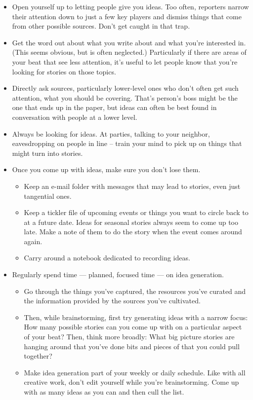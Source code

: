 \documentclass[
  11pt,
  american,
  letterpaperpaper,
  extrafontsizes,onecolumn,openright
  ]{memoir}
\providecommand{\tightlist}{%
  \setlength{\itemsep}{0pt}\setlength{\parskip}{0pt}}
\begin{document}
\begin{itemize}
\tightlist
\item
  Open yourself up to letting people give you ideas. Too often, reporters narrow their attention down to just a few key players and dismiss things that come from other possible sources. Don't get caught in that trap.
\item
  Get the word out about what you write about and what you're interested in. (This seems obvious, but is often neglected.) Particularly if there are areas of your beat that see less attention, it's useful to let people know that you're looking for stories on those topics.
\item
  Directly ask sources, particularly lower-level ones who don't often get such attention, what you should be covering. That's person's boss might be the one that ends up in the paper, but ideas can often be best found in conversation with people at a lower level.
\item
  Always be looking for ideas. At parties, talking to your neighbor, eavesdropping on people in line -- train your mind to pick up on things that might turn into stories.
\item
  Once you come up with ideas, make sure you don't lose them.

  \begin{itemize}
  \tightlist
  \item
    Keep an e-mail folder with messages that may lead to stories, even just tangential ones.
  \item
    Keep a tickler file of upcoming events or things you want to circle back to at a future date. Ideas for seasonal stories always seem to come up too late. Make a note of them to do the story when the event comes around again.
  \item
    Carry around a notebook dedicated to recording ideas.
  \end{itemize}
\item
  Regularly spend time --- planned, focused time --- on idea generation.

  \begin{itemize}
  \tightlist
  \item
    Go through the things you've captured, the resources you've curated and the information provided by the sources you've cultivated.
  \item
    Then, while brainstorming, first try generating ideas with a narrow focus: How many possible stories can you come up with on a particular aspect of your beat? Then, think more broadly: What big picture stories are hanging around that you've done bits and pieces of that you could pull together?
  \item
    Make idea generation part of your weekly or daily schedule. Like with all creative work, don't edit yourself while you're brainstorming. Come up with as many ideas as you can and then cull the list.
  \end{itemize}
\end{itemize}
\end{document}
